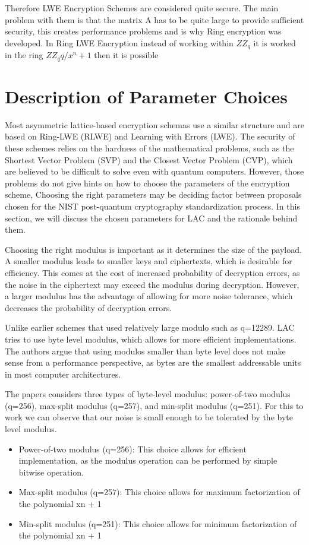 \documentclass[11pt,twoside]{article}
\begin{document}
Therefore LWE Encryption Schemes are considered quite secure. The main problem with them is that the matrix A has to be quite large to provide sufficient security, this creates performance problems and is why Ring encryption was developed. In Ring LWE Encryption instead of working within $ZZ_q$ it is worked in the ring $ZZ_qq/x^n+1$ then it is possible 



\section{Description of Parameter Choices}
Most asymmetric lattice-based encryption schemas use a 
similar structure and are based on Ring-LWE (RLWE) and Learning with Errors (LWE). 
The security of these schemes relies on the hardness of 
the mathematical problems, such as the Shortest Vector Problem (SVP)
 and the Closest Vector Problem (CVP), 
 which are believed to be difficult to solve even with quantum computers.
 However, those problems do not give hints on how to choose the 
 parameters of the encryption scheme,
 Choosing the right parameters may be deciding factor between
 proposals chosen for the NIST post-quantum cryptography standardization process.
 In this section, we will discuss the chosen parameters for LAC and the rationale behind them.

Choosing the right modulus is important as it determines 
the size of the payload. A smaller modulus leads to smaller keys and ciphertexts, 
which is desirable for efficiency. 
This comes at the cost of increased probability of decryption errors, 
as the noise in the ciphertext may exceed the modulus during decryption.
However, a larger modulus has the advantage of allowing for more noise tolerance, which 
decreases the probability of decryption errors.

Unlike earlier schemes that used relatively large modulo such as q=12289.
LAC tries to use byte level modulus, which allows for more efficient implementations.
The authors argue that using modulos smaller than byte level 
does not make sense from a performance perspective, as bytes are the smallest
addressable units in most computer architectures.

The papers considers three types of byte-level modulus: 
power-of-two modulus (q=256), max-split modulus (q=257), and min-split modulus (q=251).
For this to work we can observe that our noise is small enough to be tolerated by the byte level modulus.

\begin{itemize}
  \item Power-of-two modulus (q=256): This choice allows for efficient implementation, as the modulus operation can be performed by simple bitwise operation.
  \item Max-split modulus (q=257): This choice allows for maximum factorization of the polynomial xn + 1
  \item Min-split modulus (q=251): This choice allows for minimum factorization of the polynomial xn + 1
\end{itemize}
\end{document}
